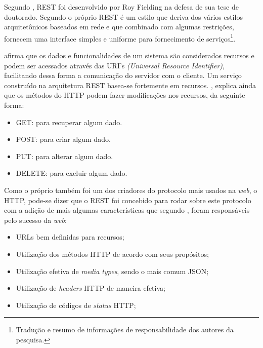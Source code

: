 	
	\par Segundo , REST foi desenvolvido por Roy Fielding
na defesa de sua tese de doutorado. Segundo o próprio 
REST é um estilo que deriva dos vários estilos arquitetônicos baseados em rede
e  que combinado com algumas restrições, fornecem uma interface simples e
uniforme para fornecimento de serviços\footnote{Tradução e resumo de
informações de responsabilidade dos autores da pesquisa.}.
			
	\par {} afirma que os dados e funcionalidades de um sistema
são considerados recursos e podem ser acessados através das URI's
\textit{(Universal Resource Identifier)}, facilitando dessa forma a comunicação
do servidor com o cliente. Um serviço construído na arquitetura REST basea-se
fortemente em recursos. , explica ainda que os métodos
do HTTP podem fazer modificações nos recursos, da seguinte forma:
	
	\begin{itemize}
		
		\item GET: para recuperar algum dado. 
		
		\item POST: para criar algum dado.
		
		\item PUT: para alterar algum dado. 
		
		\item DELETE: para excluir algum dado. 
	
	\end{itemize}

	\par Como o próprio  também foi um dos criadores do
protocolo mais usados na \textit{web}, o HTTP, pode-se dizer que o REST foi concebido
para rodar sobre este protocolo com a adição de mais algumas características
que segundo , foram responsáveis pelo sucesso da \textit{web}:
		
	\begin{itemize}
		
		\item URLs bem definidas para recursos;
		
		\item Utilização dos métodos HTTP de acordo com seus propósitos;
			
		\item Utilização efetiva de \textit{media types}, sendo o mais comum JSON;
		
		\item Utilização de \textit{headers} HTTP de maneira efetiva;
		
		\item Utilização de códigos de \textit{status} HTTP;
	
	\end{itemize}
			 
